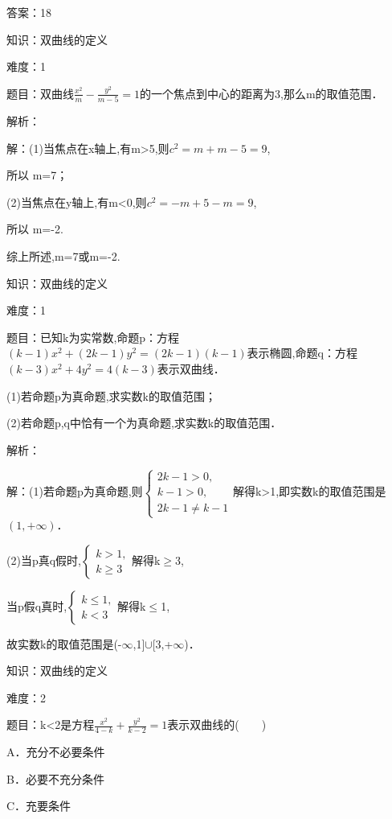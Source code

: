 \documentclass{article} %
\begin{document}
答案：18

知识：双曲线的定义

难度：1

题目：双曲线$\frac{x^2}{m}-\frac{y^2}{m-5}=1$的一个焦点到中心的距离为3,那么m的取值范围．

解析：

解：(1)当焦点在x轴上,有m>5,则$c^{2}=m+m-5=9$,

所以 m=7；

(2)当焦点在y轴上,有m<0,则$c^{2}=-m+5-m=9$,

所以 m=-2.

综上所述,m=7或m=-2.



知识：双曲线的定义

难度：1

题目：已知k为实常数,命题p：方程$(k-1)x^{2}+(2k-1)y^{2}=(2k-1)(k-1)$表示椭圆,命题q：方程$(k-3)x^{2}+4y^{2}=4(k-3)$表示双曲线．

(1)若命题p为真命题,求实数k的取值范围；

(2)若命题p,q中恰有一个为真命题,求实数k的取值范围．

解析：

解：(1)若命题p为真命题,则$\left\{
\begin{array}{l}
2k-1>0, \\
k-1>0, \\
2k-1\ne k-1
\end{array}
\right.$解得k>1,即实数k的取值范围是$(1,+{\infty})$．

(2)当p真q假时,$\left\{
\begin{array}{l}
k>1, \\
k\ge 3
\end{array}
\right.$解得k${\ge}$3,

当p假q真时,$\left\{
\begin{array}{l}
k\le 1, \\
k< 3
\end{array}
\right.$解得k${\le}$1,

故实数k的取值范围是(-${\infty}$,1]${\cup}$[3,+${\infty}$)．



知识：双曲线的定义

难度：2

题目：k<2是方程$\frac{x^2}{4-k}+\frac{y^2}{k-2}=1$表示双曲线的(　　)

A．充分不必要条件

B．必要不充分条件

C．充要条件
\end{document}
